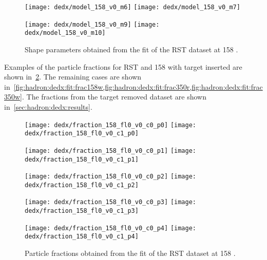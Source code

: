 \begin{figure}[!ht]
  \centering
  \texttt{[image: dedx/model\_158\_v0\_m6]}
  \texttt{[image: dedx/model\_158\_v0\_m7]}

  \texttt{[image: dedx/model\_158\_v0\_m9]}
  \texttt{[image: dedx/model\_158\_v0\_m10]}
  \caption{Shape parameters obtained from the fit of the RST dataset at 158 \GeVc.}
  \label{fig:hadron:dedx:fit:shape158r}
\end{figure}

Examples of the particle fractions for RST and 158 \GeVc
with target inserted
are shown in~\cref{fig:hadron:dedx:fit:frac158r}.
The remaining cases are shown
in~\cref{fig:hadron:dedx:fit:frac158w,fig:hadron:dedx:fit:frac350r,fig:hadron:dedx:fit:frac350w}.
The fractions from the target removed dataset are shown in~\cref{sec:hadron:dedx:results}.


\begin{figure}
  \centering
  \texttt{[image: dedx/fraction\_158\_fl0\_v0\_c0\_p0]}
  \texttt{[image: dedx/fraction\_158\_fl0\_v0\_c1\_p0]}

  \texttt{[image: dedx/fraction\_158\_fl0\_v0\_c0\_p1]}
  \texttt{[image: dedx/fraction\_158\_fl0\_v0\_c1\_p1]}

  \texttt{[image: dedx/fraction\_158\_fl0\_v0\_c0\_p2]}
  \texttt{[image: dedx/fraction\_158\_fl0\_v0\_c1\_p2]}


  \texttt{[image: dedx/fraction\_158\_fl0\_v0\_c0\_p3]}
  \texttt{[image: dedx/fraction\_158\_fl0\_v0\_c1\_p3]}

  \texttt{[image: dedx/fraction\_158\_fl0\_v0\_c0\_p4]}
  \texttt{[image: dedx/fraction\_158\_fl0\_v0\_c1\_p4]}

  \caption{Particle fractions obtained from the fit of the RST dataset at 158 \GeVc.}
  \label{fig:hadron:dedx:fit:frac158r}
\end{figure}



